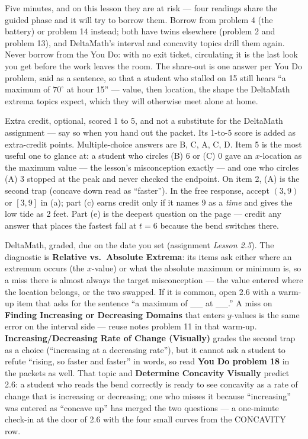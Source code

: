 \documentclass[10pt]{article}
\begin{document}
\begin{teachernote}[Debrief]
Five minutes, and on this lesson they are at risk --- four readings share the guided phase and it
will try to borrow them. Borrow from problem 4 (the battery) or problem 14 instead; both have
twins elsewhere (problem 2 and problem 13), and DeltaMath's interval and concavity topics drill
them again. Never borrow from the You Do: with no exit ticket, circulating it is the last look
you get before the work leaves the room. The share-out is one answer per You Do problem, said as
a sentence, so that a student who stalled on 15 still hears ``a maximum of $70^\circ$ at hour
15'' --- value, then location, the shape the DeltaMath extrema topics expect, which they will
otherwise meet alone at home.
\end{teachernote}

\begin{teachernote}[AP Practice]
Extra credit, optional, scored 1 to 5, and not a substitute for the DeltaMath assignment --- say so when you
hand out the packet. Its 1-to-5 score is added as extra-credit points. Multiple-choice answers are B, C, A, C, D. Item 5 is the most useful one to
glance at: a student who circles (B) 6 or (C) 0 gave an $x$-location as the maximum value --- the
lesson's misconception exactly --- and one who circles (A) 3 stopped at the peak and never checked
the endpoint. On item 2, (A) is the second trap (concave down read as ``faster''). In the free
response, accept $(3, 9)$ or $[3, 9]$ in (a); part (c) earns credit only if it names 9 as a
\emph{time} and gives the low tide as 2 feet. Part (e) is the deepest question on the page ---
credit any answer that places the fastest fall at $t = 6$ because the bend switches there.
\end{teachernote}

\begin{teachernote}[Homework]
DeltaMath, graded, due on the date you set (assignment \textit{Lesson 2.5}). The diagnostic is
\textbf{Relative vs.\ Absolute Extrema}: its items ask either where an extremum occurs (the
$x$-value) or what the absolute maximum or minimum is, so a miss there is almost always the
target misconception --- the value entered where the location belongs, or the two swapped. If
it is common, open 2.6 with a warm-up item that asks for the sentence ``a maximum of \_\_ at
\_\_.'' A miss on \textbf{Finding Increasing or Decreasing Domains} that enters $y$-values is the
same error on the interval side --- reuse notes problem 11 in that warm-up.
\textbf{Increasing/Decreasing Rate of Change (Visually)} grades the second trap as a choice
(``increasing at a decreasing rate''), but it cannot ask a student to refute ``rising, so faster
and faster'' in words, so read \textbf{You Do problem 18} in the packets as well. That topic and
\textbf{Determine Concavity Visually} predict 2.6: a student who reads the bend
correctly is ready to see concavity as a rate of change that is increasing or decreasing; one who
misses it because ``increasing'' was entered as ``concave up'' has merged the two questions --- a
one-minute check-in at the door of 2.6 with the four small curves from the CONCAVITY row.
\end{teachernote}
\end{document}
